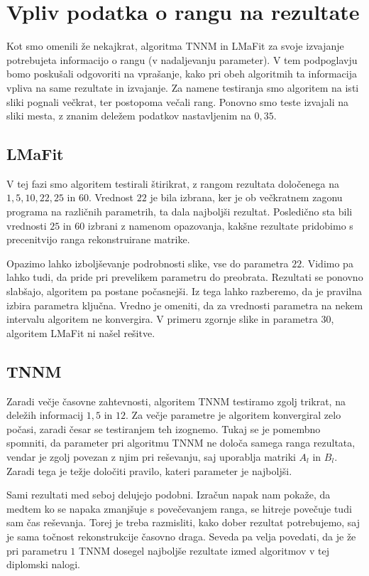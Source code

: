 \section{Vpliv podatka o rangu na rezultate}
Kot smo omenili že nekajkrat, algoritma TNNM in LMaFit za svoje izvajanje potrebujeta informacijo o rangu (v nadaljevanju parameter). V tem podpoglavju bomo poskušali odgovoriti na vprašanje, kako pri obeh algoritmih ta informacija vpliva na same rezultate in izvajanje. Za namene testiranja smo algoritem na isti sliki pognali večkrat, ter postopoma večali rang. Ponovno smo teste izvajali na sliki mesta, z znanim deležem podatkov nastavljenim na $0,35$.

\subsection{LMaFit}
V tej fazi smo algoritem testirali štirikrat, z rangom rezultata določenega na
$1, 5, 10, 22, 25$ in $60$. Vrednost $22$ je bila izbrana, ker je ob večkratnem zagonu programa na različnih parametrih, ta dala najboljši rezultat. Posledično sta bili vrednosti $25$ in $60$ izbrani z namenom opazovanja, kakšne rezultate pridobimo s precenitvijo ranga rekonstruirane matrike. 


Opazimo lahko izboljševanje podrobnosti slike, vse do parametra $22$. Vidimo pa lahko tudi, da pride pri prevelikem parametru do preobrata. Rezultati se ponovno slabšajo, algoritem pa postane počasnejši. Iz tega lahko razberemo, da je pravilna izbira parametra ključna. Vredno je omeniti, da za vrednosti parametra na nekem intervalu algoritem ne konvergira. V primeru zgornje slike in parametra $30$, algoritem LMaFit ni našel rešitve. 

\subsection{TNNM}
Zaradi večje časovne zahtevnosti, algoritem TNNM testiramo zgolj trikrat, na deležih informacij $1, 5$ in $12$. Za večje parametre je algoritem konvergiral zelo počasi, zaradi česar se testiranjem teh izognemo. Tukaj se je pomembno spomniti, da parameter pri algoritmu TNNM ne določa samega ranga rezultata, vendar je zgolj povezan z njim pri reševanju, saj uporablja matriki $A_l$ in $B_l$. Zaradi tega je težje določiti pravilo, kateri parameter je najboljši.


Sami rezultati med seboj delujejo podobni. Izračun napak nam pokaže, da medtem ko se napaka zmanjšuje s povečevanjem ranga, se hitreje povečuje tudi sam čas reševanja. Torej je treba razmisliti, kako dober rezultat potrebujemo, saj je sama točnost rekonstrukcije časovno draga. Seveda pa velja povedati, da je že pri parametru $1$ TNNM dosegel najboljše rezultate izmed algoritmov v tej diplomski nalogi.